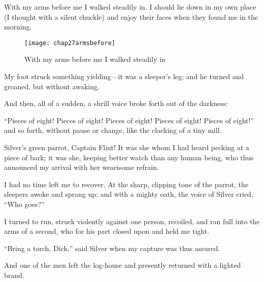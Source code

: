With my arms before me I walked steadily in. I should lie down in my own place (I thought with a silent chuckle) and enjoy their faces when they found me in the morning.

   \begin{figure}[p]
\centering
\texttt{[image: chap27armsbefore]}
\caption{With my arms before me I walked steadily in}
\end{figure} 

My foot struck something yielding---it was a sleeper’s leg; and he turned and groaned, but without awaking.

And then, all of a sudden, a shrill voice broke forth out of the darkness:

\enquote{Pieces of eight! Pieces of eight! Pieces of eight! Pieces of eight! Pieces of eight!} and so forth, without pause or change, like the clacking of a tiny mill.

Silver’s green parrot, Captain Flint! It was she whom I had heard pecking at a piece of bark; it was she, keeping better watch than any human being, who thus announced my arrival with her wearisome refrain.

I had no time left me to recover. At the sharp, clipping tone of the parrot, the sleepers awoke and sprang up; and with a mighty oath, the voice of Silver cried, \enquote{Who goes?}

I turned to run, struck violently against one person, recoiled, and ran full into the arms of a second, who for his part closed upon and held me tight.

\enquote{Bring a torch, Dick,} said Silver when my capture was thus assured.

And one of the men left the log-house and presently returned with a lighted brand.